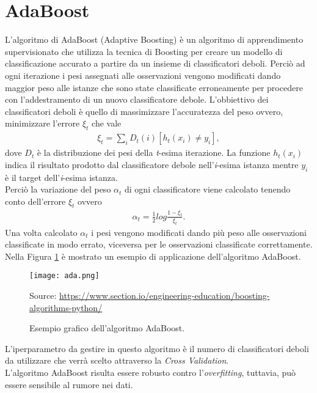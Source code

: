 \section{AdaBoost}
L'algoritmo di AdaBoost (Adaptive Boosting) \autocite{auer1995gambling} è un algoritmo di apprendimento supervisionato che utilizza la tecnica di Boosting per creare un modello di classificazione accurato a partire da un insieme di classificatori deboli. Perciò ad ogni iterazione i pesi assegnati alle osservazioni vengono modificati dando maggior peso alle istanze che sono state classificate erroneamente per procedere con l'addestramento di un nuovo classificatore debole. L'obbiettivo dei classificatori deboli è quello di massimizzare l'accuratezza del peso ovvero, minimizzare l'errore $\xi_t$ che vale 
\begin{align*}
	\xi_t = \sum_{i} D_{t}(i)[h_{t}(x_{i}) \neq y_{i}],
\end{align*} 
dove $D_{t}$ è la distribuzione dei pesi della \emph{t}-esima iterazione. La funzione $h_{t}(x_{i})$ indica il risultato prodotto dal classificatore debole nell'\emph{i}-esima istanza mentre $ y_{i}$ è il target dell'\emph{i}-esima istanza.\\
Perciò la variazione del peso $\alpha_t$ di ogni classificatore viene calcolato tenendo conto dell'errore $\xi_t$ ovvero
\begin{align*}
	\alpha_t = \frac{1}{2}log\frac{1-\xi_t}{\xi_t}.
\end{align*} 
Una volta calcolato $\alpha_t$ i pesi vengono modificati dando più peso alle osservazioni classificate in modo errato, viceversa per le osservazioni classificate correttamente.\\
Nella Figura \ref{fig:ada} è mostrato un esempio di applicazione dell'algoritmo AdaBoost.
\begin{figure}[h]
	\begin{center}
		\texttt{[image: ada.png]}
		\caption{Esempio grafico dell'algoritmo AdaBoost.
		} 
		Source: \url{https://www.section.io/engineering-education/boosting-algorithms-python/}\label{fig:ada}
	\end{center}
\end{figure}
L'iperparametro da gestire in questo algoritmo è il numero di classificatori deboli da utilizzare che verrà scelto attraverso la \emph{Cross Validation}.\\
L'algoritmo AdaBoost risulta essere robusto contro l'\emph{overfitting}, tuttavia, può essere sensibile al rumore nei dati.
